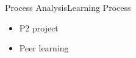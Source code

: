 \begin{frame}{Process Analysis}{Learning Process}
\begin{itemize}
    \item P2 project
    \item Peer learning
\end{itemize}
    
\end{frame}
